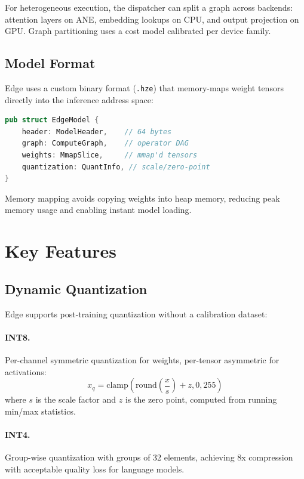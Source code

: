\documentclass[11pt,twocolumn]{article}
\begin{document}
For heterogeneous execution, the dispatcher can split a graph across backends: attention layers on ANE, embedding lookups on CPU, and output projection on GPU. Graph partitioning uses a cost model calibrated per device family.

\subsection{Model Format}

Edge uses a custom binary format (\texttt{.hze}) that memory-maps weight tensors directly into the inference address space:

\begin{lstlisting}[language=Rust]
pub struct EdgeModel {
    header: ModelHeader,    // 64 bytes
    graph: ComputeGraph,    // operator DAG
    weights: MmapSlice,     // mmap'd tensors
    quantization: QuantInfo, // scale/zero-point
}
\end{lstlisting}

Memory mapping avoids copying weights into heap memory, reducing peak memory usage and enabling instant model loading.

\section{Key Features}

\subsection{Dynamic Quantization}

Edge supports post-training quantization without a calibration dataset:

\paragraph{INT8.} Per-channel symmetric quantization for weights, per-tensor asymmetric for activations:
\begin{equation}
    x_q = \text{clamp}\left(\text{round}\left(\frac{x}{s}\right) + z, 0, 255\right)
\end{equation}
where $s$ is the scale factor and $z$ is the zero point, computed from running min/max statistics.

\paragraph{INT4.} Group-wise quantization with groups of 32 elements, achieving 8x compression with acceptable quality loss for language models.
\end{document}

